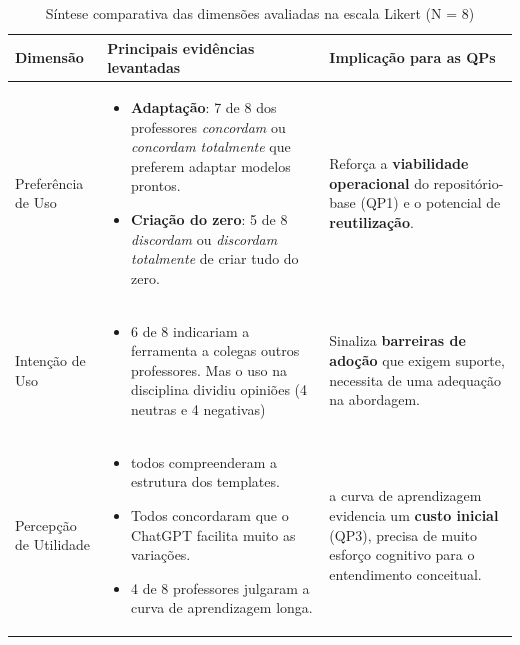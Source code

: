 \begin{table}[H]
    \centering
    \caption{Síntese comparativa das dimensões avaliadas na escala Likert (N = 8)}
    \label{tab:dimensoes-likert}
    \begin{tabular}{p{} p{} p{}}
        \toprule
        \textbf{Dimensão} & \textbf{Principais evidências levantadas} & \textbf{Implicação para as QPs}\\ \midrule
        Preferência de Uso &
        \begin{itemize}[leftmargin=*]
            \item \textbf{Adaptação}: 7 de 8 dos professores \textit{concordam} ou \textit{concordam totalmente} que preferem adaptar modelos prontos.%
            \item \textbf{Criação do zero}: 5 de 8 \textit{discordam} ou \textit{discordam totalmente} de criar tudo do zero.%
        \end{itemize} &
        Reforça a \textbf{viabilidade operacional} do repositório-base (QP1) e o potencial de \textbf{reutilização}. \\ \midrule
        
        Intenção de Uso &
        \begin{itemize}[leftmargin=*]
            \item 6 de 8 indicariam a ferramenta a colegas outros professores. Mas o uso na disciplina dividiu opiniões (4 neutras e 4 negativas)%
        \end{itemize} &
        Sinaliza \textbf{barreiras de adoção} que exigem suporte, necessita de uma adequação na abordagem. \\ \midrule
        
        Percepção de Utilidade &
        \begin{itemize}[leftmargin=*]
            \item todos compreenderam a estrutura dos templates.%
            \item Todos concordaram que o ChatGPT facilita muito as variações.%
            \item 4 de 8 professores julgaram a curva de aprendizagem longa.%
        \end{itemize} &
        a curva de aprendizagem evidencia um \textbf{custo inicial} (QP3), precisa de muito esforço cognitivo para o entendimento conceitual. \\ \bottomrule
    \end{tabular}
\end{table}



